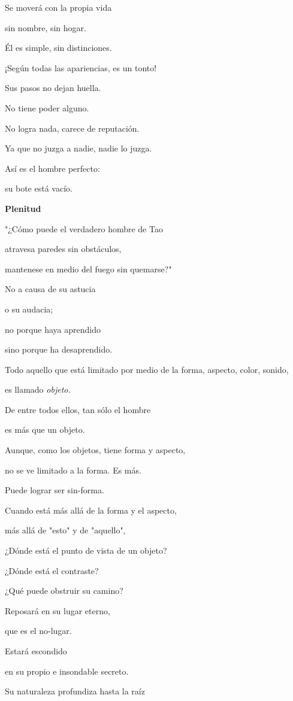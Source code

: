 Se moverá con la propia vida

sin nombre, sin hogar.

Él es simple, sin distinciones.

¡Según todas las apariencias, es un tonto!

Sus pasos no dejan huella.

No tiene poder alguno.

No logra nada, carece de reputación.

Ya que no juzga a nadie, nadie lo juzga.

Así es el hombre perfecto:

su bote está vacío.

{ }

\textbf{{Plenitud}}

"¿Cómo puede el verdadero hombre de Tao

atravesa paredes sin obstáculos,

mantenese en medio del fuego sin quemarse?"

No a causa de su astucia

o su audacia;

no porque haya aprendido

sino porque ha desaprendido.

Todo aquello que está limitado por medio de la forma, aspecto, color,
sonido,

es llamado \emph{objeto.}

De entre todos ellos, tan sólo el hombre

es más que un objeto.

Aunque, como los objetos, tiene forma y aspecto,

no se ve limitado a la forma. Es más.

Puede lograr ser sin-forma.

Cuando está más allá de la forma y el aspecto,

más allá de "esto" y de "aquello",

¿Dónde está el punto de vista de un objeto?

¿Dónde está el contraste?

¿Qué puede obstruir su camino?

Reposará en su lugar eterno,

que es el no-lugar.

Estará escondido

en su propio e insondable secreto.

Su naturaleza profundiza hasta la raíz

